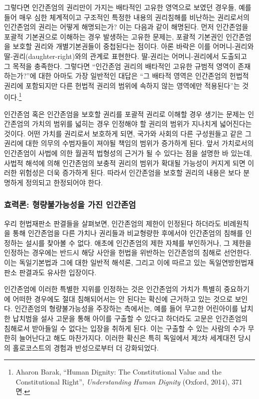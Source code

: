 그렇다면 인간존엄의 권리만이 가지는 배타적인 고유한 영역으로 보였던 경우들, 예를 들어 매우 심한 체계적이고 구조적인 특정한 내용의 권리침해를 비난하는 권리로서의 인간존엄의 권리는 어떻게 해명되는가? 이는 다음과 같이 해명된다. 먼저 인간존엄을 포괄적 기본권으로 이해하는 경우 발생하는 고유한 문제는, 포괄적 기본권인 인간존엄을 보호할 권리와 개별기본권들이 중첩된다는 점이다. 아론 바락은 이를 어머니-권리와 딸-권리(daughter-right)와의 관계로 표현한다. 딸-권리는 어머니-권리에서 도출되고 그 목적을 충족한다. 그렇다면 ``인간존엄 권리의 배타적인 고유한 규범적 영역이 존재하는가?''에 대한 아마도 가장 일반적인 대답은 ``그 배타적 영역은 인간존엄의 헌법적 권리에 포함되지만 다른 헌법적 권리의 범위에 속하지 않는 영역에만 적용된다''는 것이다.\footnote{Aharon Barak, ``Human Dignity: The Constitutional Value and the Constitutional Right'', \emph{Understanding Human Dignity} (Oxford, 2014), 371면.}

인간존엄 혹은 인간존엄을 보호할 권리를 포괄적 권리로 이해할 경우 생기는 문제는 인간존엄의 가치의 범위를 넓히는 경우 인정해야 할 권리의 범위가 지나치게 넓어진다는 것이다. 어떤 가치를 권리로서 보호하게 되면, 국가와 사회의 다른 구성원들고 같은 그 권리에 대한 의무의 수범자들이 져야될 책임의 범위가 증가하게 된다. 앞서 가치로서의 인간존엄이 사법에 의한 월권적 법형성의 근거가 될 수 있다는 점을 설명한 바 있는데, 사법적 해석에 의해 인간존엄의 보충적 권리의 범위가 확대될 가능성이 커지게 되면 이러한 위험성은 더욱 증가하게 된다. 따라서 인간존엄을 보호할 권리의 내용은 보다 분명하게 정의되고 한정되어야 한다.

\subsubsection{효력론: 형량불가능성을 가진 인간존엄}

우리 헌법재판소 판결들을 살펴보면, 인간존엄의 제한이 인정된다 하더라도 비례원칙을 통해 인간존엄을 다른 가치나 권리들과 비교형량한 후에서야 인간존엄의 침해를 인정하는 설시를 찾아볼 수 없다. 애초에 인간존엄의 제한 자체를 부인하거나, 그 제한을 인정하는 경우에는 반드시 해당 사안을 헌법을 위반하는 인간존엄의 침해로 선언한다. 이는 독일기본법과 그에 대한 일반적 해석론, 그리고 이에 따르고 있는 독일연방헌법재판소 판결과도 유사한 입장이다.

인간존엄에 이러한 특별한 지위를 인정하는 것은 인간존엄의 가치가 특별히 중요하기에 어떠한 경우에도 절대 침해되어서는 안 된다는 확신에 근거하고 있는 것으로 보인다. 인간존엄의 형량불가능성을 주장하는 측에서는, 예를 들어 무고한 어린아이를 납치한 납치범을 설사 고문을 통해 아이를 구출할 수 있다고 하더라도 고문은 인간존엄의 침해로서 받아들일 수 없다는 입장을 취하게 된다. 이는 구출할 수 있는 사람의 수가 무한히 늘어난다고 해도 마찬가지다. 이러한 확신은 특히 독일에서 제2차 세계대전 당시의 홀로코스트의 경험과 반성으로부터 더 강화되었다.

